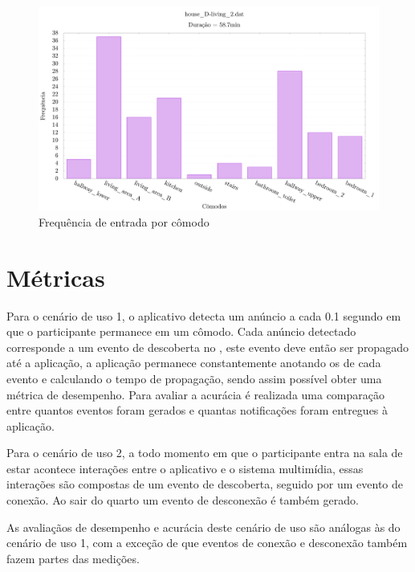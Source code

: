 \begin{figure}[htb]
	
	\begin{center}
		
		\caption{\label{fig:dataset-histogram}Frequência de entrada por cômodo}
		\includegraphics[scale=0.246]{img/dataset-histogram}
		\fonte{\autoriapropria{}}
		
	\end{center}

\end{figure}

\section{Métricas}

Para o cenário de uso 1, o aplicativo detecta um anúncio a cada 0.1 segundo em que o participante permanece em um cômodo. Cada anúncio detectado corresponde a um evento de descoberta no \stwopa{}, este evento deve então ser propagado até a aplicação, a aplicação permanece constantemente anotando os \timestamps{} de cada evento e calculando o tempo de propagação, sendo assim possível obter uma métrica de desempenho. Para avaliar a acurácia é realizada uma comparação entre quantos eventos foram gerados e quantas notificações foram entregues à aplicação.

Para o cenário de uso 2, a todo momento em que o participante entra na sala de estar acontece interações entre o aplicativo e o sistema multimídia, essas interações são compostas de um evento de descoberta, seguido por um evento de conexão. Ao sair do quarto um evento de desconexão é também gerado. 

As avaliaçãos de desempenho e acurácia deste cenário de uso são análogas às do cenário de uso 1, com a exceção de que eventos de conexão e desconexão também fazem partes das medições.

